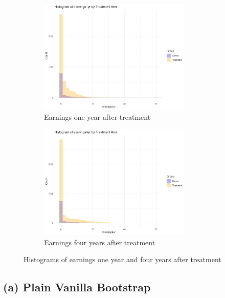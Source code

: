 \documentclass[11pt]{article}
\numberwithin{equation}{section}
\begin{document}
\begin{figure}[h]
    \centering
    \begin{subfigure}{0.48\textwidth}
        \includegraphics[width=0.8\textwidth]{output/histogram_earnings1yr_by_treatment_arm.png}
        \caption{\label{fig:hist_earnings1yr}Earnings one year after treatment}
    \end{subfigure}
    \begin{subfigure}{0.48\textwidth}
        \includegraphics[width=0.8\textwidth]{output/histogram_earnings4yr_by_treatment_arm.png}
        \caption{\label{fig:hist_earnings4yr}Earnings four years after treatment}
    \end{subfigure}
    \caption{\label{fig:hist_earnings}Histograms of earnings one year and four years after treatment}
\end{figure}

\newpage

\subsection{(a) Plain Vanilla Bootstrap}
\end{document}
